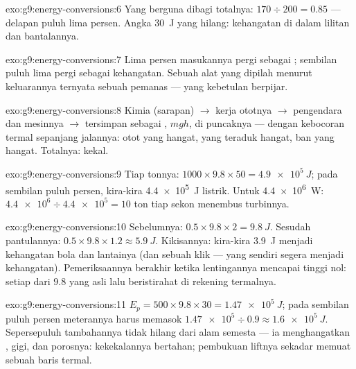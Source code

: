 \begin{solution}{exo:g9:energy-conversions:6}
Yang berguna dibagi totalnya: $170 \div 200 = 0.85$ --- delapan puluh
lima persen. Angka \qty{30}{J} yang hilang: kehangatan di dalam
lilitan dan bantalannya.
\end{solution}

\begin{solution}{exo:g9:energy-conversions:7}
Lima persen masukannya pergi sebagai ; sembilan puluh lima
pergi sebagai kehangatan. Sebuah alat yang dipilah menurut keluarannya
ternyata sebuah pemanas --- yang kebetulan berpijar.
\end{solution}

\begin{solution}{exo:g9:energy-conversions:8}
Kimia (sarapan) $\to$ kerja ototnya $\to$  pengendara
dan mesinnya $\to$ tersimpan sebagai , $m g
h$, di puncaknya --- dengan kebocoran termal sepanjang jalannya: otot yang
hangat,  yang teraduk hangat, ban yang hangat. Totalnya: kekal.
\end{solution}

\begin{solution}{exo:g9:energy-conversions:9}
Tiap tonnya: $1000 \times 9.8 \times 50 = \qty{4.9e5}{J}$;
pada sembilan puluh persen, kira-kira \qty{4.4e5}{J} listrik. Untuk
\qty{4.4e6}{W}: $\num{4.4e6} \div \num{4.4e5} = 10$ ton tiap sekon
menembus turbinnya.
\end{solution}

\begin{solution}{exo:g9:energy-conversions:10}
Sebelumnya: $0.5 \times 9.8 \times 2 = \qty{9.8}{J}$. Sesudah
pantulannya: $0.5 \times 9.8 \times 1.2 \approx \qty{5.9}{J}$.
Kikisannya: kira-kira \qty{3.9}{J} menjadi kehangatan bola dan
lantainya (dan sebuah  klik --- yang sendiri segera menjadi
kehangatan). Pemeriksaannya berakhir ketika lentingannya mencapai
tinggi nol: setiap  dari $9.8$ yang asli lalu beristirahat di
rekening termalnya.
\end{solution}

\begin{solution}{exo:g9:energy-conversions:11}
$E_p = 500 \times 9.8 \times 30 = \qty{1.47e5}{J}$; pada sembilan
puluh persen meterannya harus memasok $\num{1.47e5} \div 0.9 \approx
\qty{1.6e5}{J}$. Sepersepuluh tambahannya tidak hilang dari alam
semesta --- ia menghangatkan , gigi, dan porosnya: kekekalannya
bertahan; pembukuan liftnya sekadar memuat sebuah baris termal.
\end{solution}


